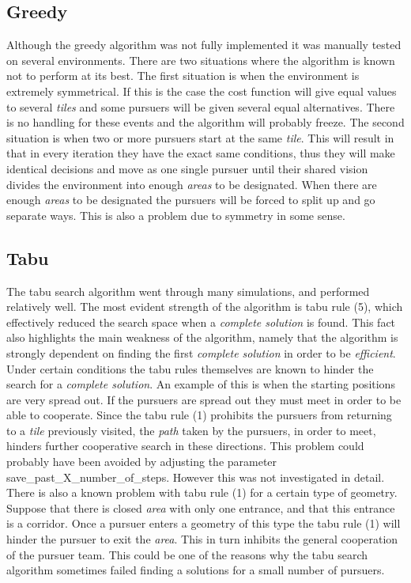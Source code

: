 \subsection{Greedy}
Although the greedy algorithm was not fully implemented it was manually tested on several environments. There are two situations where the algorithm is known not to perform at its best. The first situation is when the environment is extremely symmetrical. If this is the case the cost function will give equal values to several \emph{tiles} and some pursuers will be given several equal alternatives. There is no handling for these events and the algorithm will probably freeze. The second situation is when two or more pursuers start at the same \emph{tile}. This will result in that in every iteration they have the exact same conditions, thus they will make identical decisions and move as one single pursuer until their shared vision divides the environment into enough \emph{areas} to be designated. When there are enough \emph{areas} to be designated the pursuers will be forced to split up and go separate ways. This is also a problem due to symmetry in some sense.
\subsection{Tabu}
The tabu search algorithm went through many simulations, and performed relatively well. The most evident strength of the algorithm is tabu rule (5), which effectively reduced the search space when a \emph{complete solution} is found. This fact also highlights the main weakness of the algorithm, namely that the algorithm is strongly dependent on finding the first \emph{complete solution} in order to be \emph{efficient}. Under certain conditions the tabu rules themselves are known to hinder the search for a \emph{complete solution}. An example of this is when the starting positions are very spread out.  If the pursuers are spread out they must meet in order to be able to cooperate. Since the tabu rule (1) prohibits the pursuers from returning to a \emph{tile} previously visited, the \emph{path} taken by the pursuers, in order to meet, hinders further cooperative search in these directions. This problem could probably have been avoided by adjusting the parameter save\_past\_X\_number\_of\_steps. However this was not investigated in detail. There is also a known problem with tabu rule (1) for a certain type of geometry. Suppose that there is closed \emph{area} with only one entrance, and that this entrance is a corridor. Once a pursuer enters a geometry of this type the tabu rule (1) will hinder the pursuer to exit the \emph{area}. This in turn inhibits the general cooperation of the pursuer team. This could be one of the reasons why the tabu search algorithm sometimes failed finding a solutions for a small number of pursuers.

